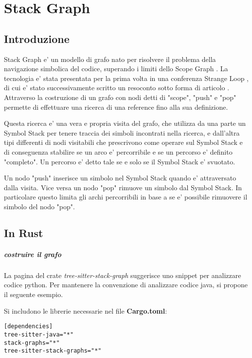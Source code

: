 \chapter{Stack Graph}

\section{Introduzione}
Stack Graph \cite{StackGraph} e' un modello di grafo nato per risolvere il problema della navigazione simbolica del codice, superando i limiti dello Scope Graph \cite{ScopeGraph}.
La tecnologia e' stata presentata per la prima volta in una conferenza Strange Loop \cite{StackGraphConference}, di cui e' stato successivamente scritto un resoconto sotto forma di articolo \cite{StackGraphIntro}.
Attraverso la costruzione di un grafo con nodi detti di "scope", "push" e "pop" permette di effettuare una ricerca di una reference fino alla sua definizione.

Questa ricerca e' una vera e propria visita del grafo, che utilizza da una parte un Symbol Stack per tenere traccia dei simboli incontrati nella ricerca, e dall'altra tipi differenti di nodi visitabili che prescrivono come operare sul Symbol Stack e di conseguenza stabilire se un arco e' percorribile e se un percorso e' definito "completo".
Un percorso e' detto tale se e solo se il Symbol Stack e' svuotato.

Un nodo "push" inserisce un simbolo nel Symbol Stack quando e' attraversato dalla visita.
Vice versa un nodo "pop" rimuove un simbolo dal Symbol Stack.
In particolare questo limita gli archi percorribili in base a se e' possibile rimuovere il simbolo del nodo "pop".

\section{In Rust}

\paragraph{costruire il grafo}

La pagina del crate \emph{tree-sitter-stack-graph} \cite{TreeSitterStackGraph} suggerisce uno snippet per analizzare codice python.
Per mantenere la convenzione di analizzare codice java, si propone il seguente esempio.

Si includono le librerie necessarie nel file \textbf{Cargo.toml}:

\begin{Verbatim}[samepage=true]
[dependencies]
tree-sitter-java="*"
stack-graphs="*"
tree-sitter-stack-graphs="*"
\end{Verbatim}

